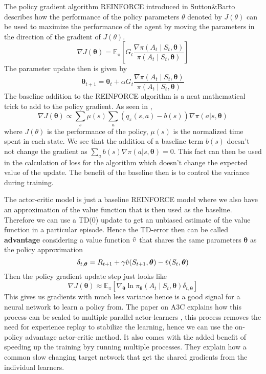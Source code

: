 The policy gradient algorithm REINFORCE introduced in Sutton\&Barto \cite{Sutton1998} describes how the performance of the policy parameters $\theta$ denoted by $J(\theta)$ can be used to maximize the performance of the agent by moving the parameters in the direction of the gradient of $J(\theta)$.
\[
   \nabla J(\boldsymbol{\theta})= \mathbb{E}_{\pi}\left[ G_{t} \frac{\nabla \pi(A_{t}\mid S_{t},\boldsymbol{\theta})}{\pi(A_{t}\mid S_{t},\boldsymbol{\theta})} \right]  
\]
The parameter update then is given by 
\[ 
    \boldsymbol{\theta}_{t+1} = \boldsymbol{\theta}_{t} + \alpha G_{t}\frac{\nabla \pi(A_{t}\mid S_{t},\boldsymbol{\theta})}{\pi(A_{t}\mid S_{t},\boldsymbol{\theta})}
\]
The baseline addition to the REINFORCE algorithm is a neat mathematical trick to add to the policy gradient. As seen in \cite{Sutton1998},
\[
    \nabla J(\boldsymbol{\theta}) \propto \sum_{s} \mu(s) \sum_{a}\left(q_{\pi}(s, a)-b(s)\right) \nabla \pi(a | s, \boldsymbol{\theta})
\]
where $J(\theta)$ is the performance of the policy, $\mu(s)$ is the normalized time spent in each state. We see that the addition of a baseline term $b(s)$ doesn't not change the gradient as $    \sum_{a} b(s) \nabla \pi(a | s, \boldsymbol{\theta}) = 0$. This fact can then be used in the calculation of loss for the algorithm which doesn't change the expected value of the update. The benefit of the baseline then is to control the variance during training. 

\medskip
\noindent
The actor-critic model is just a baseline REINFORCE model where we also have an approximation of the value function that is then used as the baseline. Therefore we can use a TD(0) update to get an unbiased estimate of the value function in a particular episode. Hence the TD-error then can be called \textbf{advantage} considering a value function $\Hat{v}$ that shares the same parameters $\boldsymbol{\theta}$ as the policy approximation
\[ 
    \delta_{t,\boldsymbol{\theta}} = R_{t+1} +\gamma\Hat{v}(S_{t+1},\boldsymbol{\theta}) - \Hat{v}(S_{t},\boldsymbol{\theta})
\]
Then the policy gradient update step just looks like 
\[ 
    \nabla J(\boldsymbol{\theta}) \approx \mathbb{E}_{\pi}\left[ \nabla_{\boldsymbol{\theta}} \ln \pi_{\boldsymbol{\theta}}(A_{t}\mid S_{t},\boldsymbol{\theta})\delta_{t,\boldsymbol{\theta}} \right]   
\]
This gives us gradients with much less variance hence is a good signal for a neural network to learn a policy from. The paper on A3C \cite{A3C} explains how this process can be scaled to multiple parallel actor-learners , this process removes the need for experience replay to stabilize the learning, hence we can use the on-policy advantage actor-critic method. It also comes with the added benefit of speeding up the training byy running multiple processes. They explain how a common slow changing target network that get the shared gradients from the individual learners. 

